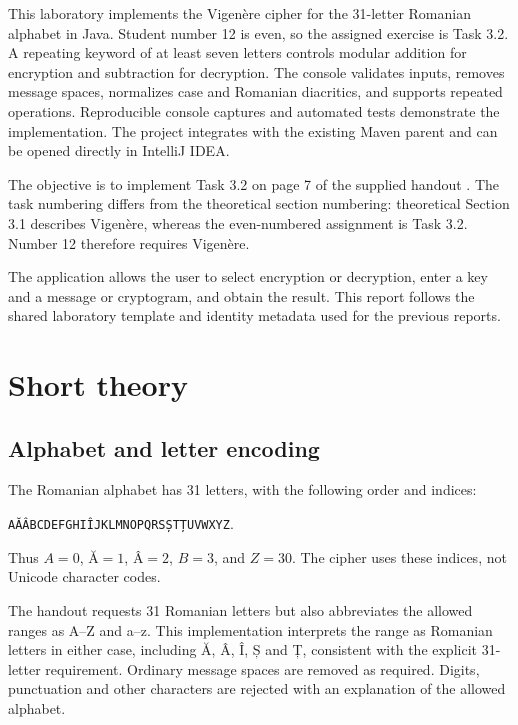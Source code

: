 \documentclass{utmreport}
\begin{document}
\makeutmreporttitlepage
\tableofcontents
\clearpage
\begin{utmabstract}[Abstract]
This laboratory implements the Vigenère cipher for the 31-letter Romanian alphabet in Java. Student number 12 is even, so the assigned exercise is Task 3.2. A repeating keyword of at least seven letters controls modular addition for encryption and subtraction for decryption. The console validates inputs, removes message spaces, normalizes case and Romanian diacritics, and supports repeated operations. Reproducible console captures and automated tests demonstrate the implementation. The project integrates with the existing Maven parent and can be opened directly in IntelliJ IDEA.
\end{utmabstract}

\utmintroduction
The objective is to implement Task 3.2 on page 7 of the supplied handout \cite{handout}. The task numbering differs from the theoretical section numbering: theoretical Section 3.1 describes Vigenère, whereas the even-numbered assignment is Task 3.2. Number 12 therefore requires Vigenère.

The application allows the user to select encryption or decryption, enter a key and a message or cryptogram, and obtain the result. This report follows the shared laboratory template and identity metadata used for the previous reports.

\chapter{Short theory}
\section{Alphabet and letter encoding}
The Romanian alphabet has 31 letters, with the following order and indices:
\begin{center}
\texttt{AĂÂBCDEFGHIÎJKLMNOPQRSȘTȚUVWXYZ}.
\end{center}
Thus $A=0$, $\text{Ă}=1$, $\text{Â}=2$, $B=3$, and $Z=30$. The cipher uses these indices, not Unicode character codes.

The handout requests 31 Romanian letters but also abbreviates the allowed ranges as A--Z and a--z. This implementation interprets the range as Romanian letters in either case, including Ă, Â, Î, Ș and Ț, consistent with the explicit 31-letter requirement. Ordinary message spaces are removed as required. Digits, punctuation and other characters are rejected with an explanation of the allowed alphabet.
\end{document}
